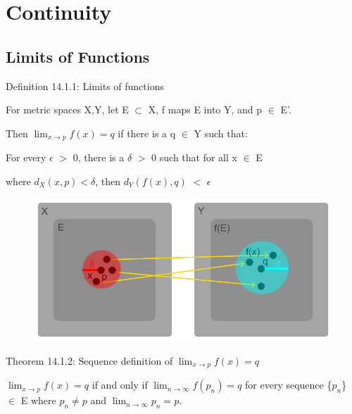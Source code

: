 \newpage

\section[Day 14: Continuity]{Continuity}

\subsection{ Limits of Functions }

{ \color{blue} Definition 14.1.1: Limits of functions }

    \begin{adjustbox}{minipage=14cm, right, vspace=0.1cm 0cm}
        For metric spaces X,Y, let E $\subset$ X, f maps E into Y,
        and p $\in$ E'.
        
        Then $\lim_{x \rightarrow p} f(x) = q$
        if there is a q $\in$ Y such that:
        
        \begin{adjustbox}{minipage=13cm, right, vspace=0.1cm 0cm}
            For every $\epsilon$ $>$ 0, there is a $\delta$ $>$ 0
            such that for all x $\in$ E
            
            where $d_X(x,p) < \delta$, then
            $d_Y(f(x),q)$ $<$ $\epsilon$
        \end{adjustbox}
    \end{adjustbox}

\begin{figure}[h]
	\centering
	\includegraphics[scale=0.45]{Images/14.1.1.png}
\end{figure}

{ \color{red} Theorem 14.1.2:
Sequence definition of $\lim_{x \rightarrow p} f(x) = q$ }

    \begin{adjustbox}{minipage=14cm, right, vspace=0.1cm 0cm}
        $\lim_{x \rightarrow p} f(x) = q$ if and only if
        $\lim_{n \rightarrow \infty} f(p_n) = q$ for every
        sequence \{$p_n$\} $\in$ E where $p_n \not = p$ and
        $\lim_{n \rightarrow \infty} p_n = p$.
    \end{adjustbox}

